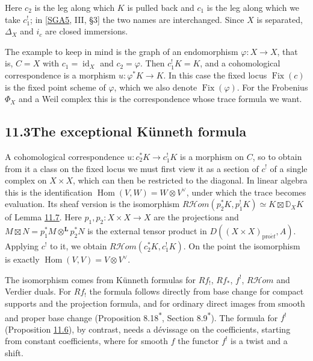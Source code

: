\documentclass[11pt]{article}
\newcommand{\bpout}[1]{#1\textsuperscript{\hyperlink{bp-outside}{\ensuremath{\ast}}}}
\providecommand{\Fix}{}\renewcommand{\Fix}{\operatorname{Fix}}
\providecommand{\cHom}{}\renewcommand{\cHom}{R\mathcal{H}\!om}
\begin{document}
\label{bp185}%
Here \(c_2\) is the leg along which \(K\) is pulled back and \(c_1\) is the leg along which we take \(c_1^!\); in [\hyperref[bp332]{SGA5}, III, §3] the two names are interchanged. Since \(X\) is separated, \(\Delta_X\) and \(i_c\) are closed immersions.

The example to keep in mind is the graph of an endomorphism \(\varphi:X\to X\), that is, \(C=X\) with \(c_1=\operatorname{id}_X\) and \(c_2=\varphi\). Then \(c_1^!K=K\), and a cohomological correspondence is a morphism \(u:\varphi^*K\to K\). In this case the fixed locus \(\Fix(c)\) is the fixed point scheme of \(\varphi\), which we also denote \(\Fix(\varphi)\). For the Frobenius \(\Phi_X\) and a Weil complex this is the correspondence whose trace formula we want.


\subsection*{\texorpdfstring{11.3\quad The exceptional Künneth formula}{11.3 The exceptional Künneth formula}}
\label{bp186}%
\label{bp187}%
A cohomological correspondence \(u:c_2^*K\to c_1^!K\) is a morphism on \(C\), so to obtain from it a class on the fixed locus we must first view it as a section of \(c^!\) of a single complex on \(X\times X\), which can then be restricted to the diagonal. In linear algebra this is the identification \(\operatorname{Hom}(V,W)=W\otimes V^\vee\), under which the trace becomes evaluation. Its sheaf version is the isomorphism \(\cHom(p_2^*K,p_1^!K)\simeq K\boxtimes\mathbb D_XK\) of Lemma \hyperref[bp191]{11.7}. Here \(p_1,p_2:X\times X\to X\) are the projections and \(M\boxtimes N=p_1^*M\otimes^{\mathbf L} p_2^*N\) is the external tensor product in \(D((X\times X)_{\mathrm{pro}\acute{e}t},A)\). Applying \(c^!\) to it, we obtain \(\cHom(c_2^*K,c_1^!K)\). On the point the isomorphism is exactly \(\operatorname{Hom}(V,V)=V\otimes V^\vee\).

The isomorphism comes from Künneth formulas for \(Rf_!\), \(Rf_*\), \(f^!\), \(\cHom\) and Verdier duals. For \(Rf_!\) the formula follows directly from base change for compact supports and the projection formula, and for ordinary direct images from smooth and proper base change (Proposition \bpout{8.18}, Section \bpout{8.9}). The formula for \(f^!\) (Proposition \hyperref[bp188]{11.6}), by contrast, needs a dévissage on the coefficients, starting from constant coefficients, where for smooth \(f\) the functor \(f^!\) is a twist and a shift.
\end{document}
